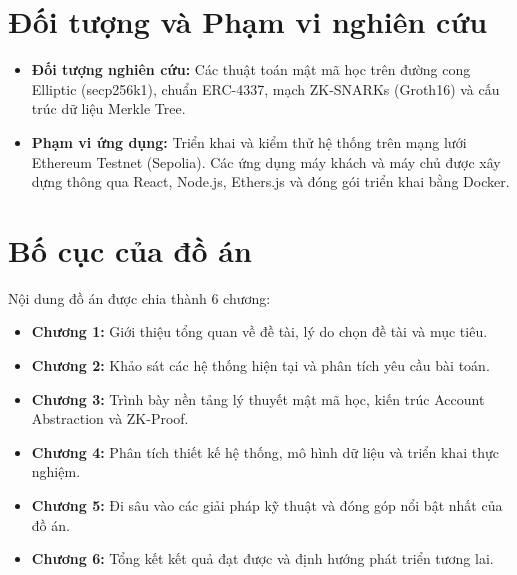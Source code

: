 \documentclass[../DoAn.tex]{subfiles}
\begin{document}
\section{Đối tượng và Phạm vi nghiên cứu}
\begin{itemize}
    \item \textbf{Đối tượng nghiên cứu:} Các thuật toán mật mã học trên đường cong Elliptic (secp256k1), chuẩn ERC-4337, mạch ZK-SNARKs (Groth16) và cấu trúc dữ liệu Merkle Tree.
    \item \textbf{Phạm vi ứng dụng:} Triển khai và kiểm thử hệ thống trên mạng lưới Ethereum Testnet (Sepolia). Các ứng dụng máy khách và máy chủ được xây dựng thông qua React, Node.js, Ethers.js và đóng gói triển khai bằng Docker.
\end{itemize}

\section{Bố cục của đồ án}
Nội dung đồ án được chia thành 6 chương:
\begin{itemize}
    \item \textbf{Chương 1:} Giới thiệu tổng quan về đề tài, lý do chọn đề tài và mục tiêu.
    \item \textbf{Chương 2:} Khảo sát các hệ thống hiện tại và phân tích yêu cầu bài toán.
    \item \textbf{Chương 3:} Trình bày nền tảng lý thuyết mật mã học, kiến trúc Account Abstraction và ZK-Proof.
    \item \textbf{Chương 4:} Phân tích thiết kế hệ thống, mô hình dữ liệu và triển khai thực nghiệm.
    \item \textbf{Chương 5:} Đi sâu vào các giải pháp kỹ thuật và đóng góp nổi bật nhất của đồ án.
    \item \textbf{Chương 6:} Tổng kết kết quả đạt được và định hướng phát triển tương lai.
\end{itemize}
\end{document}

